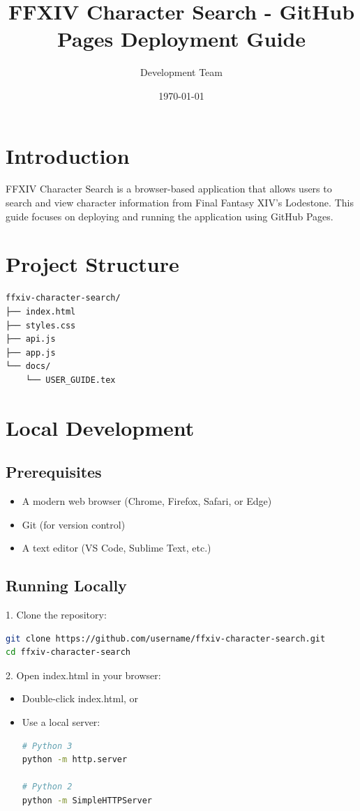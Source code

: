 \documentclass{article}
\title{FFXIV Character Search - GitHub Pages Deployment Guide}
\author{Development Team}
\date{\today}
\begin{document}
\maketitle

\section{Introduction}
FFXIV Character Search is a browser-based application that allows users to search and view character information from Final Fantasy XIV's Lodestone. This guide focuses on deploying and running the application using GitHub Pages.

\section{Project Structure}
\begin{lstlisting}
ffxiv-character-search/
├── index.html
├── styles.css
├── api.js
├── app.js
└── docs/
    └── USER_GUIDE.tex
\end{lstlisting}

\section{Local Development}

\subsection{Prerequisites}
\begin{itemize}
    \item A modern web browser (Chrome, Firefox, Safari, or Edge)
    \item Git (for version control)
    \item A text editor (VS Code, Sublime Text, etc.)
\end{itemize}

\subsection{Running Locally}
1. Clone the repository:
\begin{lstlisting}[language=bash]
git clone https://github.com/username/ffxiv-character-search.git
cd ffxiv-character-search
\end{lstlisting}

2. Open index.html in your browser:
\begin{itemize}
    \item Double-click index.html, or
    \item Use a local server:
    \begin{lstlisting}[language=bash]
# Python 3
python -m http.server

# Python 2
python -m SimpleHTTPServer
    \end{lstlisting}
\end{itemize}
\end{document}
